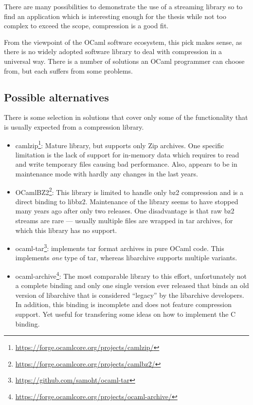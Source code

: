 \documentclass[parskip=half]{scrreprt}
\begin{document}
There are many possibilities to demonstrate the use of a streaming library so
to find an application which is interesting enough for the thesis while not too
complex to exceed the scope, compression is a good fit.

From the viewpoint of the OCaml software ecosystem, this pick makes sense, as
there is no widely adopted software library to deal with compression in a
universal way. There is a number of solutions an OCaml programmer can choose
from, but each suffers from some problems.

\subsection{Possible alternatives}
\label{sec:alternatives}

There is some selection in solutions that cover only some of the functionality
that is usually expected from a compression library.

\begin{itemize}
  \item camlzip\footnote{\url{https://forge.ocamlcore.org/projects/camlzip/}}:
    Mature library, but supports only Zip archives. One specific limitation is
    the lack of support for in-memory data which requires to read and write
    temporary files causing bad performance. Also, appears to be in maintenance
    mode with hardly any changes in the last years.
  \item OCamlBZ2\footnote{\url{https://forge.ocamlcore.org/projects/camlbz2/}}:
    This library is limited to handle only bz2 compression and is a direct
    binding to libbz2. Maintenance of the library seems to have stopped many
    years ago after only two releases. One disadvantage is that raw bz2
    streams are rare — usually multiple files are wrapped in tar archives,
    for which this library has no support.
  \item ocaml-tar\footnote{\url{https://github.com/samoht/ocaml-tar}}:
    implements tar format archives in pure OCaml code. This implements
    \emph{one} type of tar, whereas libarchive supports multiple variants.
  \item ocaml-archive\footnote{\url{https://forge.ocamlcore.org/projects/ocaml-archive/}}:
    The most comparable library to this effort, unfortunately not a complete
    binding and only one single version ever released that binds an old version
    of libarchive that is considered \enquote{legacy} by the libarchive
    developers. In addition, this binding is incomplete and does not feature
    compression support. Yet useful for transfering some ideas on how to
    implement the C binding.
\end{itemize}
\end{document}
